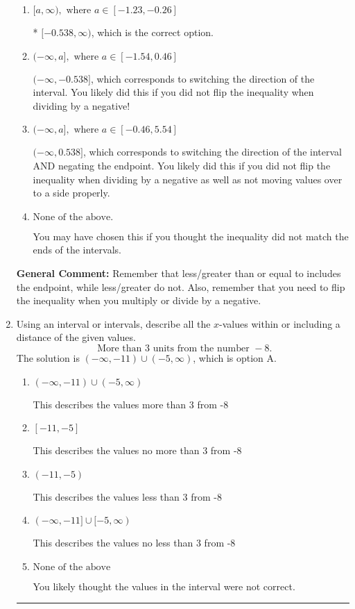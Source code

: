 \documentclass{extbook}[14pt]
\newcommand{\litem}[1]{\item #1

\rule{\textwidth}{0.4pt}}
\begin{document}
\begin{enumerate}
{\begin{enumerate}[label=\Alph*.]
 $[0.538, \infty)$, which corresponds to negating the endpoint of the solution.
\item \( [a, \infty), \text{ where } a \in [-1.23, -0.26] \)

* $[-0.538, \infty)$, which is the correct option.
\item \( (-\infty, a], \text{ where } a \in [-1.54, 0.46] \)

 $(-\infty, -0.538]$, which corresponds to switching the direction of the interval. You likely did this if you did not flip the inequality when dividing by a negative!
\item \( (-\infty, a], \text{ where } a \in [-0.46, 5.54] \)

 $(-\infty, 0.538]$, which corresponds to switching the direction of the interval AND negating the endpoint. You likely did this if you did not flip the inequality when dividing by a negative as well as not moving values over to a side properly.
\item \( \text{None of the above}. \)

You may have chosen this if you thought the inequality did not match the ends of the intervals.
\end{enumerate}

\textbf{General Comment:} Remember that less/greater than or equal to includes the endpoint, while less/greater do not. Also, remember that you need to flip the inequality when you multiply or divide by a negative.
}
\litem{
Using an interval or intervals, describe all the $x$-values within or including a distance of the given values.
\[ \text{ More than } 3 \text{ units from the number } -8. \]The solution is \( (-\infty, -11) \cup (-5, \infty) \), which is option A.\begin{enumerate}[label=\Alph*.]
\item \( (-\infty, -11) \cup (-5, \infty) \)

This describes the values more than 3 from -8
\item \( [-11, -5] \)

This describes the values no more than 3 from -8
\item \( (-11, -5) \)

This describes the values less than 3 from -8
\item \( (-\infty, -11] \cup [-5, \infty) \)

This describes the values no less than 3 from -8
\item \( \text{None of the above} \)

You likely thought the values in the interval were not correct.
\end{enumerate}

}
\end{enumerate}
\end{document}
